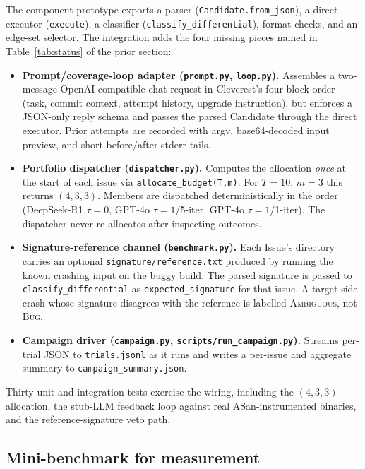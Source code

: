 \documentclass{article}
\begin{document}
The component prototype exports a parser (\texttt{Candidate.from\_json}), a
direct executor (\texttt{execute}), a classifier
(\texttt{classify\_differential}), format checks, and an edge-set selector.
The integration adds the four missing pieces named in
Table~\ref{tab:status} of the prior section:
\begin{itemize}[nosep]
  \item \textbf{Prompt/coverage-loop adapter (\texttt{prompt.py}, \texttt{loop.py}).}
    Assembles a two-message OpenAI-compatible chat request in Cleverest's
    four-block order (task, commit context, attempt history, upgrade
    instruction), but enforces a JSON-only reply schema and passes the parsed
    Candidate through the direct executor. Prior attempts are recorded with
    argv, base64-decoded input preview, and short before/after stderr tails.
  \item \textbf{Portfolio dispatcher (\texttt{dispatcher.py}).}
    Computes the allocation \emph{once} at the start of each issue via
    \texttt{allocate\_budget(T,m)}. For $T{=}10$, $m{=}3$ this returns
    $(4,3,3)$. Members are dispatched deterministically in the order
    (DeepSeek-R1 $\tau{=}0$, GPT-4o $\tau{=}1$/5-iter, GPT-4o $\tau{=}1$/1-iter).
    The dispatcher never re-allocates after inspecting outcomes.
  \item \textbf{Signature-reference channel (\texttt{benchmark.py}).}
    Each Issue's directory carries an optional
    \texttt{signature/reference.txt} produced by running the known crashing
    input on the buggy build. The parsed signature is passed to
    \texttt{classify\_differential} as \texttt{expected\_signature} for that
    issue. A target-side crash whose signature disagrees with the reference
    is labelled \textsc{Ambiguous}, not \textsc{Bug}.
  \item \textbf{Campaign driver (\texttt{campaign.py}, \texttt{scripts/run\_campaign.py}).}
    Streams per-trial JSON to \texttt{trials.jsonl} as it runs and writes a
    per-issue and aggregate summary to \texttt{campaign\_summary.json}.
\end{itemize}
Thirty unit and integration tests exercise the wiring, including the
$(4,3,3)$ allocation, the stub-LLM feedback loop against real ASan-instrumented
binaries, and the reference-signature veto path.

\subsection{Mini-benchmark for measurement}
\label{sec:integrated:bench}
\end{document}
